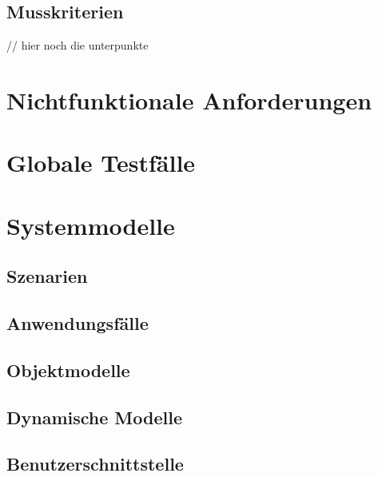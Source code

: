 \documentclass[parskip=full]{scrartcl}
\begin{document}
\subsection{Musskriterien} // hier noch die unterpunkte

\section{Nichtfunktionale Anforderungen}

\section{Globale Testfälle}

\section{Systemmodelle}

\subsection{Szenarien}

\subsection{Anwendungsfälle}

\subsection{Objektmodelle}

\subsection{Dynamische Modelle}

\subsection{Benutzerschnittstelle}
\end{document}

